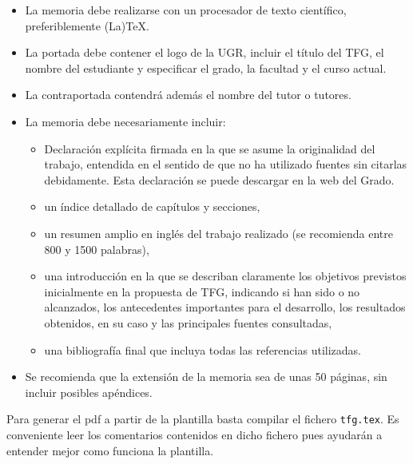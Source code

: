 \begin{itemize}
  \item La  memoria  debe  realizarse  con  un  procesador  de  texto  científico,  preferiblemente (La)TeX.
  \item La portada  debe contener  el  logo  de  la UGR,  incluir  el  título del TFG, el nombre del estudiante y especificar el grado, la facultad y el curso actual.
  \item La contraportada contendrá además el nombre del tutor o tutores.
  \item La memoria debe necesariamente incluir:
    \begin{itemize}
      \item Declaración explícita firmada en la que se asume la originalidad del trabajo, entendida en el sentido de que no ha utilizado fuentes sin citarlas debidamente. Esta declaración se puede descargar en la web del Grado.
      \item un índice detallado de capítulos y secciones,
      \item un resumen amplio en inglés del trabajo realizado (se recomienda entre 800 y 1500 palabras),
      \item una introducción en la que se describan claramente los objetivos previstos inicialmente en la propuesta de TFG, indicando si han sido o no alcanzados, los antecedentes importantes para el desarrollo, los resultados obtenidos, en su caso y las principales fuentes consultadas,
      \item una bibliografía final que incluya todas las referencias utilizadas.
    \end{itemize}
  \item Se recomienda que la extensión de la memoria sea de unas 50 páginas, sin incluir posibles apéndices.
\end{itemize}

Para generar el pdf a partir de la plantilla basta compilar el fichero \texttt{tfg.tex}. Es conveniente leer los comentarios contenidos en dicho fichero pues ayudarán a entender mejor como funciona la plantilla. 

